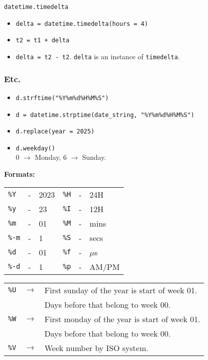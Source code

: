\begin{center}
    \large{\texttt{datetime.timedelta}}
\end{center}

\begin{itemize}
\item \texttt{delta = datetime.timedelta(hours = 4)}
\item \texttt{t2 = t1 + delta}
\item \texttt{delta = t2 - t2}. \texttt{delta} is an instance of \texttt{timedelta}.\\
\end{itemize}

\subsubsection{Etc.}

\begin{itemize}
\item \texttt{d.strftime("\%Y\%m\%d\%H\%M\%S")}
\item \texttt{d = datetime.strptime(date\_string, "\%Y\%m\%d\%H\%M\%S")}
\item \texttt{d.replace(year = 2025)}
\item \texttt{d.weekday()}\\
        0 $\to$ Monday, 6 $\to$ Sunday.\\
\end{itemize}  

\columnbreak

\textbf{Formats:}\\
\vspace{2pt}
\begin{tabular}{lcl|lcl}
    \hline
    \texttt{\%Y}  & - & 2023     &   \texttt{\%H}  & - &    24H\\
    \texttt{\%y}  & - & 23       &   \texttt{\%I}  & - &    12H\\
    \texttt{\%m}  & - & 01       &   \texttt{\%M}  & - &    mins\\
    \texttt{\%-m} & - & 1        &   \texttt{\%S}  & - &    secs\\
    \texttt{\%d}  & - & 01       &   \texttt{\%f}  & - &    $\mu$s\\
    \texttt{\%-d} & - & 1        &   \texttt{\%p}  & - &    AM/PM\\
    \hline
\end{tabular} 


\begin{tabularx}{\linewidth}{lcX}
    
\texttt{\%U}    & $\to$ & First sunday of the year is start of week 01.\\
                &       & Days before that belong to week 00.\\ 
\texttt{\%W}    & $\to$ & First monday of the year is start of week 01.\\
                &       & Days before that belong to week 00.\\ 
\texttt{\%V}    & $\to$ & Week number by ISO system.\\

\end{tabularx}

